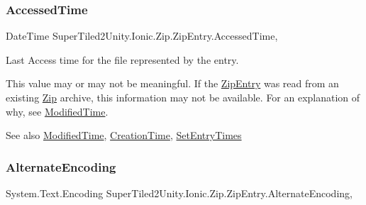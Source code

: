 \subsubsection{\texorpdfstring{Accessed\+Time}{AccessedTime}}
{\footnotesize\ttfamily Date\+Time Super\+Tiled2\+Unity.\+Ionic.\+Zip.\+Zip\+Entry.\+Accessed\+Time\hspace{0.3cm}{\ttfamily [get]}, {\ttfamily [set]}}



Last Access time for the file represented by the entry. 

This value may or may not be meaningful. If the {\ttfamily \mbox{\hyperlink{class_super_tiled2_unity_1_1_ionic_1_1_zip_1_1_zip_entry}{Zip\+Entry}}} was read from an existing \mbox{\hyperlink{namespace_super_tiled2_unity_1_1_ionic_1_1_zip}{Zip}} archive, this information may not be available. For an explanation of why, see \mbox{\hyperlink{class_super_tiled2_unity_1_1_ionic_1_1_zip_1_1_zip_entry_a88021d72ea8b94c762388d92d74c2e0d}{Modified\+Time}}. 

\begin{DoxySeeAlso}{See also}
\mbox{\hyperlink{class_super_tiled2_unity_1_1_ionic_1_1_zip_1_1_zip_entry_a88021d72ea8b94c762388d92d74c2e0d}{Modified\+Time}}, \mbox{\hyperlink{class_super_tiled2_unity_1_1_ionic_1_1_zip_1_1_zip_entry_a38ef2ae810c3b89b1f23ebea918fb60e}{Creation\+Time}}, \mbox{\hyperlink{class_super_tiled2_unity_1_1_ionic_1_1_zip_1_1_zip_entry_a7331ca69b05c476a9d321b30d7649766}{Set\+Entry\+Times}}


\end{DoxySeeAlso}
\mbox{\label{class_super_tiled2_unity_1_1_ionic_1_1_zip_1_1_zip_entry_a7a5ff9afc8cad1de6fbfc76a7bf786ee}} 
\subsubsection{\texorpdfstring{Alternate\+Encoding}{AlternateEncoding}}
{\footnotesize\ttfamily System.\+Text.\+Encoding Super\+Tiled2\+Unity.\+Ionic.\+Zip.\+Zip\+Entry.\+Alternate\+Encoding\hspace{0.3cm}{\ttfamily [get]}, {\ttfamily [set]}}



